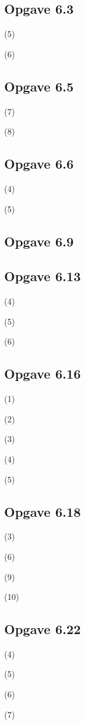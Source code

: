 \documentclass[11pt]{article}
\begin{document}

  \subsection*{Opgave 6.3}

  (5)

  (6)

  \subsection*{Opgave 6.5}

  (7)

  (8)

  \subsection*{Opgave 6.6}

  (4)

  (5)

  \subsection*{Opgave 6.9}

  \subsection*{Opgave 6.13}

  (4)

  (5)

  (6)

  \subsection*{Opgave 6.16}

  (1)

  (2)

  (3)

  (4)

  (5)

  \subsection*{Opgave 6.18}

  (3)

  (6)

  (9)

  (10)

  \subsection*{Opgave 6.22}

  (4)

  (5)

  (6)

  (7)
\end{document}
